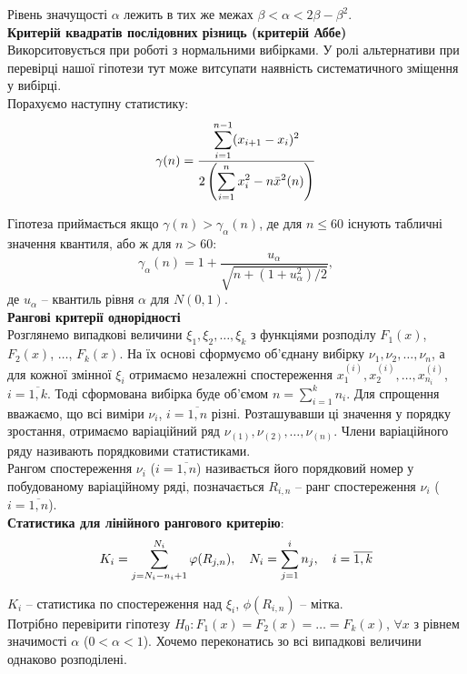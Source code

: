 Рівень значущості $\alpha$ лежить в тих же межах $\beta < \alpha < 2 \beta - \beta^2$. \\

\textbf{Критерій квадратів послідовних різниць (критерій Аббе)} \\

Викорситовується при роботі з нормальними вибірками. У ролі альтернативи при перевірці нашої гіпотези тут може витсупати наявність систематичного зміщення у вибірці. \\

Порахуємо наступну статистику:
\[ \gamma(n) = \dfrac{\displaystyle\sum\limits_{i=1}^{n-1} (x_{i+1} - x_i)^2}{2 \left(\displaystyle\sum\limits_{i=1}^n x_i^2 - n \bar{x}^2(n)\right)} \]

Гіпотеза приймається якщо $\gamma(n) > \gamma_\alpha(n)$, де для $n \le 60$ існують табличні значення квантиля, або ж для $n > 60$: 
\[ \gamma_\alpha(n) = 1 + \dfrac{u_\alpha}{\sqrt{n + (1 + u_\alpha^2)/2}}, \] де $u_\alpha$ -- квантиль рівня $\alpha$ для $N(0, 1)$. \\

\textbf{Рангові критерії однорідності} \\

Розглянемо випадкові величини $\xi_1, \xi_2, \ldots, \xi_k$ з функціями розподілу $F_1(x)$, $F_2(x)$, $\ldots$, $F_k(x)$. На їх основі сформуємо об'єднану вибірку $\nu_1, \nu_2, \ldots, \nu_n$, а для кожної змінної $\xi_i$ отримаємо незалежні спостереження $x_1^{(i)}, x_2^{(i)}, \ldots, x_{n_i}^{(i)}$, $i = \overline{1,k}$. Тоді сформована вибірка буде об'ємом $n = \sum_{i=1}^k n_i$. Для спрощення вважаємо, що всі виміри $\nu_i$, $i=\overline{1,n}$ різні. Розташувавши ці значення у порядку зростання, отримаємо варіаційний ряд $\nu_{(1)}, \nu_{(2)}, \ldots, \nu_{(n)}$. Члени варіаційного ряду називають порядковими статистиками. \\

Рангом спостереження $\nu_i$ ($i = \overline{1,n}$) називається його порядковий номер у побудованому варіаційному ряді, позначається $R_{i,n}$ -- ранг спостереження $\nu_i$ ($i = \overline{1,n}$). \\

\textbf{Статистика для лінійного рангового критерію}: \[ K_i = \displaystyle\sum\limits_{j = N_i - n_i + 1}^{N_i} \varphi(R_{j,n}), \quad N_i = \displaystyle\sum\limits_{j=1}^i n_j, \quad i = \overline{1,k} \]

$K_i$ -- статистика по спостереження над $\xi_i$, $\phi(R_{i,n})$ -- мітка. \\

Потрібно перевірити гіпотезу $H_0: F_1(x) = F_2(x) = \ldots = F_k(x)$, $\forall x$ з рівнем значимості $\alpha$ ($0 < \alpha < 1$). Хочемо переконатись зо всі випадкові величини однаково розподілені. \\

